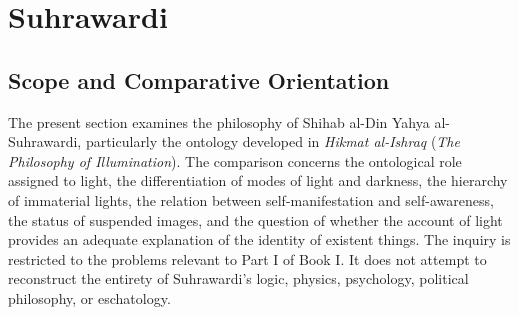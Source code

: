 
%
%
%
%
%

\section{Suhrawardi}
\label{sec:ch08_s14}


\subsection{Scope and Comparative Orientation}
\label{sec:ch08-s14-ss01}

\label{para:VS.B01.P01.C08.S14.SS01.P001}

The present section examines the philosophy of Shihab al-Din Yahya
al-Suhrawardi, particularly the ontology developed in
\textit{Hikmat al-Ishraq} (\textit{The Philosophy of Illumination}).
The comparison concerns the ontological role assigned to light,
the differentiation of modes of light and darkness, the hierarchy
of immaterial lights, the relation between self-manifestation and
self-awareness, the status of suspended images, and the question
of whether the account of light provides an adequate explanation
of the identity of existent things. The inquiry is restricted to
the problems relevant to Part I of Book I. It does not attempt
to reconstruct the entirety of Suhrawardi's logic, physics,
psychology, political philosophy, or eschatology.

